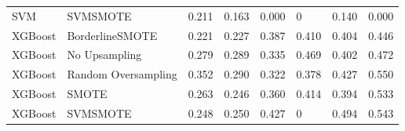 \begin{tabular}{llllllll}
                            SVM &                      SVMSMOTE & 0.211 &                     0.163 &                 0.000 &                      0 &                                   0.140 &    0.000 \\
                        XGBoost &               BorderlineSMOTE & 0.221 &                     0.227 &                 0.387 &                  0.410 &                                   0.404 &    0.446 \\
                        XGBoost &                 No Upsampling & 0.279 &                     0.289 &                 0.335 &                  0.469 &                                   0.402 &    0.472 \\
                        XGBoost &           Random Oversampling & 0.352 &                     0.290 &                 0.322 &                  0.378 &                                   0.427 &    0.550 \\
                        XGBoost &                         SMOTE & 0.263 &                     0.246 &                 0.360 &                  0.414 &                                   0.394 &    0.533 \\
                        XGBoost &                      SVMSMOTE & 0.248 &                     0.250 &                 0.427 &                      0 &                                   0.494 &    0.543 \\
\bottomrule
\end{tabular}
